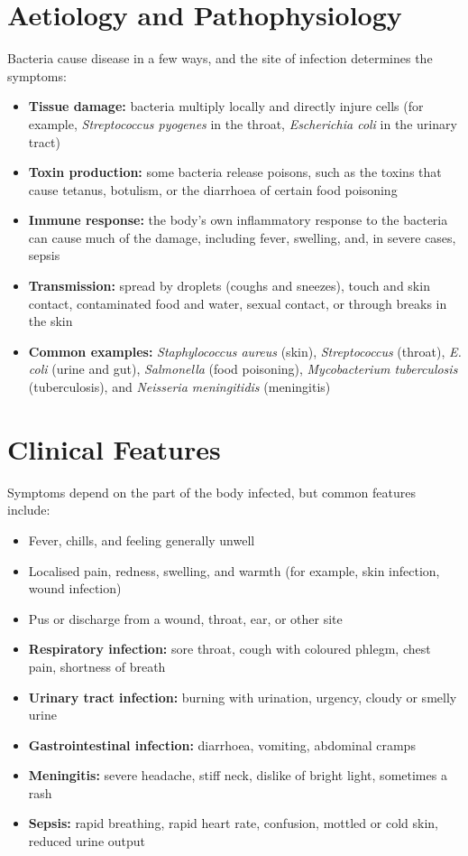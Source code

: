 \section*{Aetiology and Pathophysiology}
Bacteria cause disease in a few ways, and the site of infection determines the symptoms:

\begin{itemize}
    \item \textbf{Tissue damage:} bacteria multiply locally and directly injure cells (for example, \textit{Streptococcus pyogenes} in the throat, \textit{Escherichia coli} in the urinary tract)
    \item \textbf{Toxin production:} some bacteria release poisons, such as the toxins that cause tetanus, botulism, or the diarrhoea of certain food poisoning
    \item \textbf{Immune response:} the body's own inflammatory response to the bacteria can cause much of the damage, including fever, swelling, and, in severe cases, sepsis
    \item \textbf{Transmission:} spread by droplets (coughs and sneezes), touch and skin contact, contaminated food and water, sexual contact, or through breaks in the skin
    \item \textbf{Common examples:} \textit{Staphylococcus aureus} (skin), \textit{Streptococcus} (throat), \textit{E. coli} (urine and gut), \textit{Salmonella} (food poisoning), \textit{Mycobacterium tuberculosis} (tuberculosis), and \textit{Neisseria meningitidis} (meningitis)
\end{itemize}

\section*{Clinical Features}
Symptoms depend on the part of the body infected, but common features include:

\begin{itemize}
    \item Fever, chills, and feeling generally unwell
    \item Localised pain, redness, swelling, and warmth (for example, skin infection, wound infection)
    \item Pus or discharge from a wound, throat, ear, or other site
    \item \textbf{Respiratory infection:} sore throat, cough with coloured phlegm, chest pain, shortness of breath
    \item \textbf{Urinary tract infection:} burning with urination, urgency, cloudy or smelly urine
    \item \textbf{Gastrointestinal infection:} diarrhoea, vomiting, abdominal cramps
    \item \textbf{Meningitis:} severe headache, stiff neck, dislike of bright light, sometimes a rash
    \item \textbf{Sepsis:} rapid breathing, rapid heart rate, confusion, mottled or cold skin, reduced urine output
\end{itemize}

